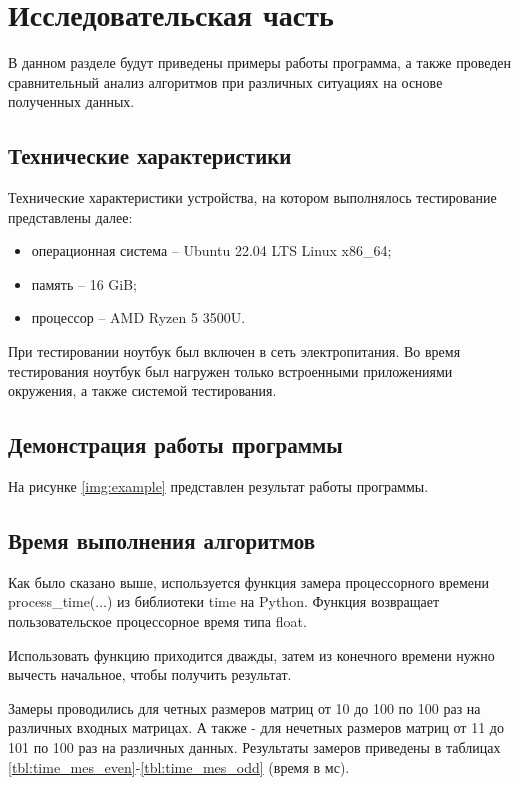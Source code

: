 \chapter{Исследовательская часть}

В данном разделе будут приведены примеры работы программа, а также проведен сравнительный анализ алгоритмов при различных ситуациях на основе полученных данных.

\section{Технические характеристики}

Технические характеристики устройства, на котором выполнялось тестирование представлены далее:

\begin{itemize}
    \item операционная система -- Ubuntu 22.04 LTS \cite{ubuntu} Linux \cite{linux} x86\_64;
    \item память -- 16 GiB;
    \item процессор -- AMD Ryzen 5 3500U.
\end{itemize}

При тестировании ноутбук был включен в сеть электропитания. Во время тестирования ноутбук был нагружен только встроенными приложениями окружения, а также системой тестирования.
\pagebreak
\section{Демонстрация работы программы}

На рисунке \ref{img:example} представлен результат работы программы.

\clearpage

\section{Время выполнения алгоритмов}

Как было сказано выше, используется функция замера процессорного времени process\_time(...) из библиотеки time на Python. Функция возвращает пользовательское процессорное время типа float.

Использовать функцию приходится дважды, затем из конечного времени нужно вычесть начальное, чтобы получить результат.

Замеры проводились для четных размеров матриц от 10 до 100 по 100 раз на различных входных матрицах. А также - для нечетных размеров матриц от 11 до 101 по 100 раз на различных данных.
Результаты замеров приведены в таблицах \ref{tbl:time_mes_even}-\ref{tbl:time_mes_odd} (время в мс).

